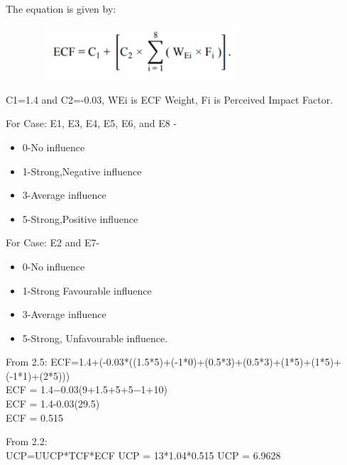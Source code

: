 {{{\normalsize{The equation is given by:}

\label{sec: Figure 9}
\begin{figure}[htp]
    \centering
    \includegraphics[width=8cm,height=2cm]{p9.png}
    \label{fig:Figure 9}
\end{figure}


\normalsize{C1=1.4 and C2=-0.03, WEi is ECF Weight, Fi is Perceived Impact Factor.\linebreak \\}

\normalsize{For Case: E1, E3, E4, E5, E6, and E8 -}
\begin{itemize}[noitemsep]
    \item 0-No influence
    \item 1-Strong,Negative influence
    \item 3-Average influence
    \item 5-Strong,Positive influence
\end{itemize}

\normalsize{For Case: E2 and E7-}
\begin{itemize}[noitemsep]
    \item 0-No influence
    \item 1-Strong Favourable influence
    \item 3-Average influence
    \item 5-Strong, Unfavourable influence.
\end{itemize}

\normalsize{From 2.5: }
\normalsize{ECF=1.4+(-0.03*((1.5*5)+(-1*0)+(0.5*3)+(0.5*3)+(1*5)+(1*5)+(-1*1)+(2*5)))\\}
\normalsize{ECF = 1.4−0.03(9+1.5+5+5−1+10)\\}
\normalsize{ECF = 1.4-0.03(29.5)\\}
\normalsize{ECF = 0.515 \linebreak \\}

\normalsize{From 2.2:\\}
\normalsize{UCP=UUCP*TCF*ECF\linebreak
UCP = 13*1.04*0.515\linebreak
UCP = 6.9628\linebreak}

}}}
